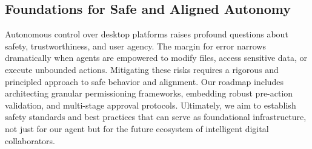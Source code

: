 \subsection{Foundations for Safe and Aligned Autonomy}
Autonomous control over desktop platforms raises profound questions about safety, trustworthiness, and user agency. The margin for error narrows dramatically when agents are empowered to modify files, access sensitive data, or execute unbounded actions. Mitigating these risks requires a rigorous and principled approach to safe behavior and alignment. Our roadmap includes architecting granular permissioning frameworks, embedding robust pre-action validation, and multi-stage approval protocols. Ultimately, we aim to establish safety standards and best practices that can serve as foundational infrastructure, not just for our agent but for the future ecosystem of intelligent digital collaborators.

\clearpage
